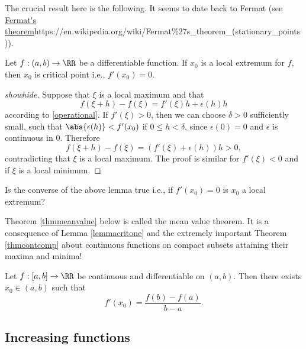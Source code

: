 \documentclass{article}
\begin{document}
The crucial result here is the following. It seems to date back to Fermat (see \url{Fermat's theorem}{https://en.wikipedia.org/wiki/Fermat\%27s_theorem_(stationary_points)}).

\begin{lemma}[emph]\label{lemmacritone}
  Let $f : (a, b)\rightarrow \RR$ be a differentiable function. If
  $x_0$ is a local extremum for $f$, then $x_0$ is critical point i.e., $f'(x_0) = 0$.
\end{lemma}
\begin{proof}[showhide]
 Suppose that $\xi$ is a local maximum and that
  \begin{equation*}
    f(\xi + h) - f(\xi) = f'(\xi) h + \epsilon(h) h
  \end{equation*}
  according to \eqref{operational}. If $f'(\xi)>0$, then we can choose
  $\delta >0$ sufficiently small, such that $\abs{ \epsilon(h) } <
  f'(x_0)$ if $0\leq h < \delta$, since $\epsilon(0) = 0$ and
  $\epsilon $ is continuous in $0$. Therefore
  \begin{equation*}
    f(\xi +  h) - f(\xi) = (f'(\xi) + \epsilon(h)) h > 0,
  \end{equation*} 
  contradicting that $\xi$ is a local maximum.  The proof is similar
  for $f'(\xi) < 0$ and if $\xi$ is a local minimum.
\end{proof}

\beginshex
Is the converse of the above lemma true i.e., if $f'(x_0) = 0$ is
$x_0$ a local extremum?
\endshex

Theorem \ref{thmmeanvalue} below is called the mean value theorem. It is a consequence of Lemma \ref{lemmacritone}
and the extremely important Theorem \ref{thmcontcomp} about continuous functions
on compact subsets attaining their maxima and minima!


\begin{frameit}
\begin{theorem}\label{thmmeanvalue}
  Let $f:[a, b]\rightarrow \RR$ be continuous and differentiable
  on $(a, b)$. Then there exists $x_0\in (a, b)$ such that
  \begin{equation*}
    f'(x_0) = \frac{f(b) - f(a)}{b - a}.\label{xiaim}
  \end{equation*}
\end{theorem}
\end{frameit}

\subsection{Increasing functions}
\end{document}
